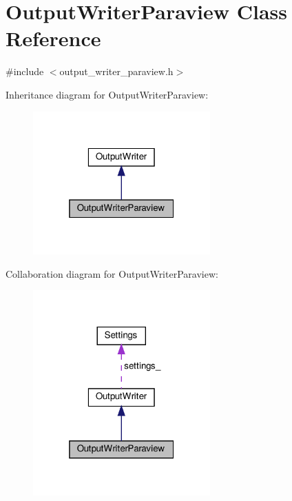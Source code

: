 \hypertarget{classOutputWriterParaview}{}\section{Output\+Writer\+Paraview Class Reference}
\label{classOutputWriterParaview}


{\ttfamily \#include $<$output\+\_\+writer\+\_\+paraview.\+h$>$}



Inheritance diagram for Output\+Writer\+Paraview\+:\nopagebreak
\begin{figure}[H]
\begin{center}
\leavevmode
\includegraphics[width=193pt]{classOutputWriterParaview__inherit__graph}
\end{center}
\end{figure}


Collaboration diagram for Output\+Writer\+Paraview\+:
\nopagebreak
\begin{figure}[H]
\begin{center}
\leavevmode
\includegraphics[width=193pt]{classOutputWriterParaview__coll__graph}
\end{center}
\end{figure}
